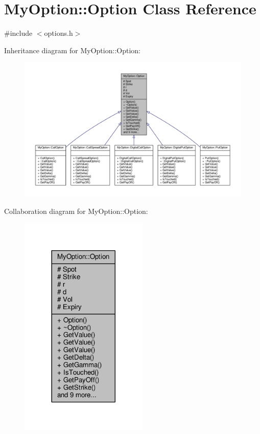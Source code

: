 \hypertarget{classMyOption_1_1Option}{}\section{My\+Option\+:\+:Option Class Reference}
\label{classMyOption_1_1Option}


{\ttfamily \#include $<$options.\+h$>$}



Inheritance diagram for My\+Option\+:\+:Option\+:
\nopagebreak
\begin{figure}[H]
\begin{center}
\leavevmode
\includegraphics[width=350pt]{classMyOption_1_1Option__inherit__graph}
\end{center}
\end{figure}


Collaboration diagram for My\+Option\+:\+:Option\+:
\nopagebreak
\begin{figure}[H]
\begin{center}
\leavevmode
\includegraphics[width=173pt]{classMyOption_1_1Option__coll__graph}
\end{center}
\end{figure}

